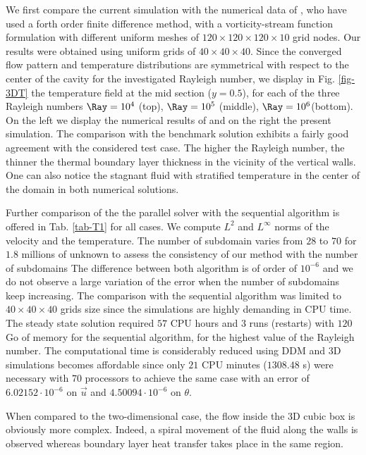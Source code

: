 We first compare the current simulation with the numerical data of \cite{Wakashima-2004}, who have used a forth order finite difference method, with a vorticity-stream function formulation with different uniform meshes of  $120 \times 120 \times 120 \times 10$ grid nodes.
Our results were obtained using uniform grids of $ 40 \times 40 \times 40$.
Since the converged flow pattern and temperature distributions are symmetrical with respect to the center of the cavity for the investigated Rayleigh number,
we display in 
Fig. \ref{fig-3DT} the temperature field at the mid section ($y = 0.5$), for each of the three Rayleigh numbers $\Ray = 10^4$ (top), $\Ray = 10^5$ (middle), $\Ray = 10^6$(bottom).  
On the left we display the numerical results of \cite{Wakashima-2004} and on the right the present simulation.
The comparison with the benchmark solution exhibits a fairly good agreement with the considered test case.
The higher the Rayleigh number, the thinner the thermal boundary layer thickness in the vicinity of the vertical walls.
One can also notice the stagnant fluid with stratified temperature in the center of the domain in both numerical solutions.

Further comparison of the the parallel solver with the sequential algorithm is offered in Tab. \ref{tab-T1} for all cases. 
We compute $L^2$ and $L^\infty$ norms of the velocity and the temperature.
The number of subdomain varies from $28$ to $70$ for $1.8$ millions of unknown to assess the consistency of our method with the number of subdomains 
The difference between both algorithm is of order of $10^{-6}$
and we do not observe a large variation of the error when the number of subdomains keep increasing.
The comparison with the sequential algorithm was limited to $40 \times 40 \times 40$ grids size since the simulations are highly demanding in CPU time.
The steady state solution required $57$ CPU hours and $3$ runs (restarts) with $120$ Go of memory for the sequential algorithm, for the highest value of the Rayleigh number. 
The computational time is considerably reduced using DDM and 3D simulations becomes affordable  since only $21$ CPU minutes  ($1308.48$ s) were necessary with $70$ processors to achieve the same case with an error of $6.02152 \cdot 10^{-6}$ on $\vec u$ and $ 4.50094 \cdot 10^{-6} $ on $\theta$.

When compared to the two-dimensional case, the flow inside the 3D cubic box is obviously more complex.
Indeed, a spiral movement of the fluid along the walls is observed whereas boundary layer heat transfer takes place in the same region.

